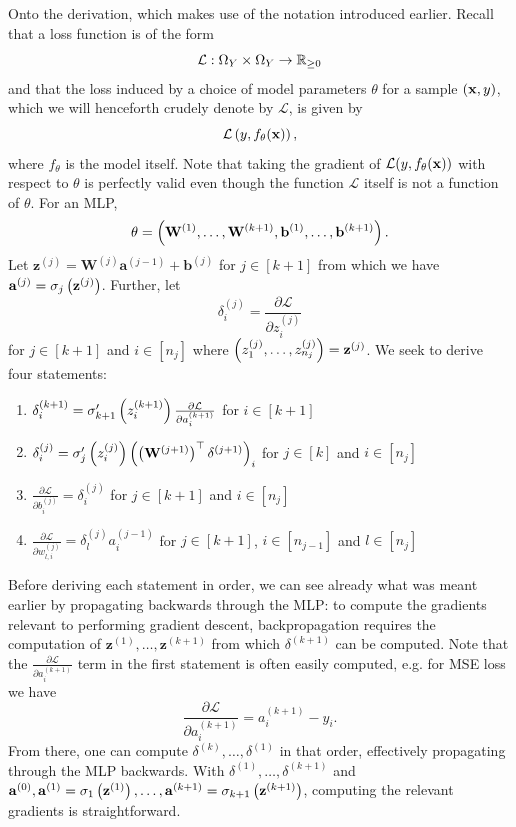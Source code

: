 \documentclass[11pt]{article}
\begin{document}
Onto the derivation, which makes use of the notation introduced earlier. Recall that a loss function is of the form
$$
\mathcal{L}:\Omega_{Y}\times\Omega_{Y}\to\mathbb{R}_{\geq0}
$$
and that the loss induced by a choice of model parameters $\theta$ for a sample $(\mathbf{x},y)$, which we will henceforth crudely denote by $\mathcal{L}$, is given by
$$
\mathcal{L}\left(y,f_{\theta}(\mathbf{x})\right),
$$
where $f_{\theta}$ is the model itself. Note that taking the gradient of $\mathcal{L}(y,f_{\theta}(\mathbf{x}))$ with respect to $\theta$ is perfectly valid even though the function $\mathcal{L}$ itself is not a function of $\theta$. For an MLP,
$$
\theta
=
\left(\mathbf{W}^{(1)},\dots,\mathbf{W}^{(k+1)},\mathbf{b}^{(1)},\dots,\mathbf{b}^{(k+1)}\right).
$$
Let $\mathbf{z}^{(j)}=\mathbf{W}^{(j)}\mathbf{a}^{(j-1)}+\mathbf{b}^{(j)}$ for $j\in[k+1]$ from which we have $\mathbf{a}^{(j)}=\sigma_{j}\left(\mathbf{z}^{(j)}\right)$. Further, let
$$
\delta^{(j)}_i
=
\frac{\partial\mathcal{L}}{\partial z^{(j)}_i}
$$
for $j\in[k+1]$ and $i\in[n_j]$ where $\left(z_1^{(j)},\dots,z_{n_j}^{(j)}\right)=\mathbf{z}^{(j)}$. We seek to derive four statements:
\begin{enumerate}
    \item $\delta_i^{(k+1)}=\sigma_{k+1}'\left(z_i^{(k+1)}\right)\frac{\partial\mathcal{L}}{\partial a_i^{(k+1)}}$ for $i\in[k+1]$
    \item $\delta_i^{(j)}=\sigma_{j}'\left(z_i^{(j)}\right)\left(\left(\mathbf{W}^{(j+1)}\right)^\top\delta^{(j+1)}\right)_i$ for $j\in[k]$ and $i\in[n_j]$
    \item $\frac{\partial\mathcal{L}}{\partial b^{(j)}_i}=\delta^{(j)}_i$ for $j\in[k+1]$ and $i\in[n_j]$
    \item $\frac{\partial\mathcal{L}}{\partial w_{l,i}^{(j)}}=\delta_l^{(j)}a_i^{(j-1)}$ for $j\in[k+1]$, $i\in[n_{j-1}]$ and $l\in[n_j]$
\end{enumerate}
Before deriving each statement in order, we can see already what was meant earlier by propagating backwards through the MLP: to compute the gradients relevant to performing gradient descent, backpropagation requires the computation of $\mathbf{z}^{(1)},\dots,\mathbf{z}^{(k+1)}$ from which $\delta^{(k+1)}$ can be computed. Note that the $\frac{\partial\mathcal{L}}{\partial a_i^{(k+1)}}$ term in the first statement is often easily computed, e.g. for MSE loss we have
$$
\frac{\partial\mathcal{L}}{\partial a_i^{(k+1)}}
=
a_i^{(k+1)}-y_i.
$$
From there, one can compute $\delta^{(k)},\dots,\delta^{(1)}$ in that order, effectively propagating through the MLP backwards. With $\delta^{(1)},\dots,\delta^{(k+1)}$ and $\mathbf{a}^{(0)},\mathbf{a}^{(1)}=\sigma_1\left(\mathbf{z}^{(1)}\right),\dots,\mathbf{a}^{(k+1)}=\sigma_{k+1}\left(\mathbf{z}^{(k+1)}\right)$, computing the relevant gradients is straightforward.
\end{document}
